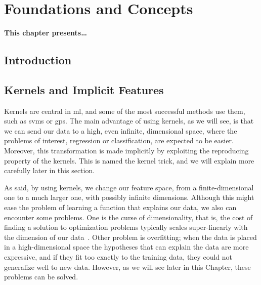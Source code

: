
\chapter{Foundations and Concepts} %
\label{Chapter2}

{\bf \small{
This chapter presents\dots
}}


\section{Introduction}









\section{Kernels and Implicit Features}
Kernels are central in \acrshort{ml}, and some of the most successful methods use them, such as \acrshort{svms} or \acrshort{gps}.
The main advantage of using kernels, as we will see, is that we can send our data to a high, even infinite, dimensional space, where the problems of interest, regression or classification, are expected to be easier. Moreover, this transformation is made implicitly by exploiting the reproducing property of the kernels. This is named the kernel trick, and we will explain more carefully later in this section.

As said, by using kernels, we change our feature space, from a finite-dimensional one to a much larger one, with possibly infinite dimensions. Although this might ease the problem of learning a function that explains our data, we also can encounter some problems. One is the curse of dimensionality, that is, the cost of finding a solution to optimization problems typically scales super-linearly with the dimension of our data~\citep{Chapelle07}. Other problem is overfitting; when the data is placed in a high-dimensional space the hypotheses that can explain the data are more expressive, and if they fit too exactly to the training data, they could not generalize well to new data. However, as we will see later in this Chapter, these problems can be solved.


